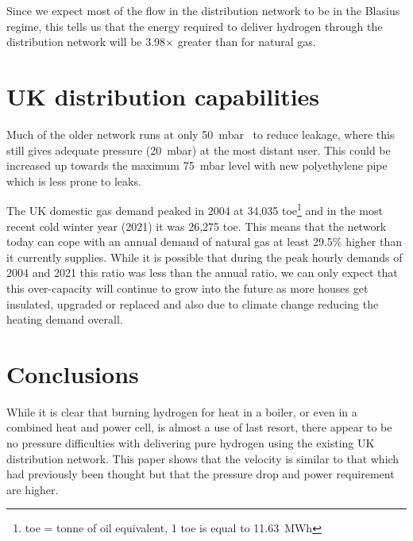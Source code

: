 \documentclass[5p]{elsarticle} %
\begin{document}
Since we expect most of the flow in the distribution network to be in the Blasius regime, this tells us that the energy required to deliver hydrogen through the distribution network will be 3.98$\times$ greater than for natural gas.

\section{UK distribution capabilities}
\label{sec:distcapable}

Much of the older network runs at only 50~mbar~\cite{ARUP2023} to reduce leakage, where this still gives adequate pressure (20~mbar) at the most distant user. 
This could be increased up towards the maximum 75~mbar level with new polyethylene pipe which is less prone to leaks\citep{ARUP2023}. 

The UK domestic gas demand\citep{DESNZ2023a} peaked in 2004 at 34,035 toe\footnote{toe = tonne of oil equivalent, 1 toe is equal to 11.63~MWh} and in the most recent cold winter year (2021) it was 26,275 toe. 
This means that the network today can cope with an annual demand of natural gas at least 29.5\% higher than it currently supplies.
While it is possible that during the peak hourly demands of 2004 and 2021 this ratio was less than the annual ratio, we can only expect that this over-capacity will continue to grow into the future as more houses get insulated, upgraded or replaced and also due to climate change reducing the heating demand overall\citep{Christidis2021}. 

\section{Conclusions}
\label{sec:conc}

While it is clear that burning hydrogen for heat in a boiler, or even in a combined heat and power cell, is almost a use of last resort\citep{Rosenow2024,Liebreich2021}, there appear to be no pressure difficulties with delivering pure hydrogen using the existing UK distribution network. This paper shows that the velocity is similar to that which had previously been thought but that the pressure drop and power requirement are higher.
\end{document}
